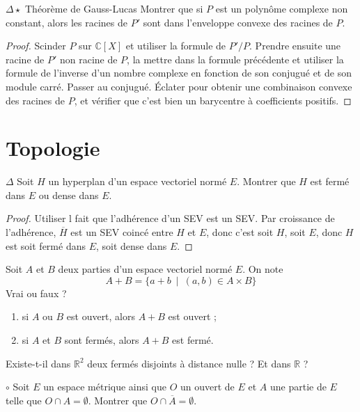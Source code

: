\documentclass[french,a4paper]{article}
\newcommand{\R}{\mathbb{R}}
\newcommand{\C}{\mathbb{C}}
\theoremstyle{plain}
\theoremstyle{definition}
\theoremstyle{remark}
\begin{document}
\begin{ex}{$\Delta\star$ Théorème de Gauss-Lucas} Montrer que si $P$ est un polynôme complexe non constant, alors les racines de $P'$ sont dans l'enveloppe convexe des racines de $P$.
\end{ex}
\begin{proof}
	Scinder $P$ sur $\C[X]$ et utiliser la formule de $P'/P$. Prendre ensuite une racine de $P'$ non racine de $P$, la mettre dans la formule précédente et utiliser la formule de l'inverse d'un nombre complexe en fonction de son conjugué et de son module carré. Passer au conjugué. Éclater pour obtenir une combinaison convexe des racines de $P$, et vérifier que c'est bien un barycentre à coefficients positifs.
\end{proof}

\section{Topologie}

\begin{ex}{$\Delta$}
	Soit $H$ un hyperplan d'un espace vectoriel normé $E$. Montrer que $H$ est fermé dans $E$ ou dense dans $E$.
\end{ex}
\begin{proof}
	Utiliser l fait que l'adhérence d'un SEV est un SEV. Par croissance de l'adhérence, $\overline{H}$ est un SEV coincé entre $H$ et $E$, donc c'est soit $H$, soit $E$, donc $H$ est soit fermé dans $E$, soit dense dans $E$.
\end{proof}

\begin{ex}{}
	Soit $A$ et $B$ deux parties d'un espace vectoriel normé $E$. On note $$A+B=\{a+b\ \mid\ (a,b)\in A\times B\}$$ Vrai ou faux ?
	\begin{enumerate}
		\item si $A$ ou $B$ est ouvert, alors $A+B$ est ouvert ;
		\item si $A$ et $B$ sont fermés, alors $A+B$ est fermé.
	\end{enumerate}
\end{ex}

\begin{ex}{}
	Existe-t-il dans $\R^2$ deux fermés disjoints à distance nulle ? Et dans $\R$ ?
\end{ex}

\begin{ex}{$\circ$}
	Soit $E$ un espace métrique ainsi que $O$ un ouvert de $E$ et $A$ une partie de $E$ telle que $O\cap A=\emptyset$. Montrer que $O\cap\overline{A}=\emptyset$.
\end{ex}
\end{document}
